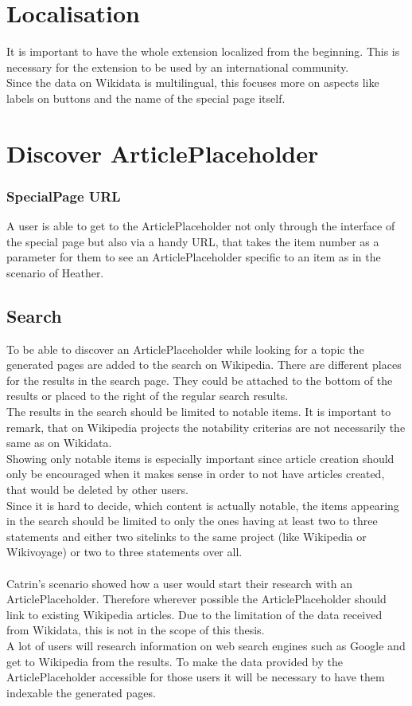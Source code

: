 \section{Localisation}
It is important to have the whole extension localized from the beginning. This is necessary for the extension to be used by an international community. \\ Since the data on Wikidata is multilingual, this focuses more on aspects like labels on buttons and the name of the special page itself.

\section{Discover ArticlePlaceholder}
\subsubsection{SpecialPage URL}
A user is able to get to the ArticlePlaceholder not only through the interface of the special page but also via a handy URL, that takes the item number as a parameter for them to see an ArticlePlaceholder specific to an item as in the scenario of Heather.

\subsection{Search}
To be able to discover an ArticlePlaceholder while looking for a topic the generated pages are added to the search on Wikipedia. There are different places for the results in the search page. They could be attached to the bottom of the results or placed to the right of the regular search results. \\
The results in the search should be limited to notable items. It is important to remark, that on Wikipedia projects the notability criterias are not necessarily the same as on Wikidata. \\
Showing only notable items is especially important since article creation should only be encouraged when it makes sense in order to not have articles created, that would be deleted by other users. \\
Since it is hard to decide, which content is actually notable, the items appearing in the search should be limited to only the ones having at least two to three statements and either two sitelinks to the same project (like Wikipedia or Wikivoyage) or two to three statements over all. \\
\\
Catrin's scenario showed how a user would start their research with an ArticlePlaceholder. Therefore wherever possible the ArticlePlaceholder should link to existing Wikipedia articles. Due to the limitation of the data received from Wikidata, this is not in the scope of this thesis.
\\
A lot of users will research information on web search engines such as Google and get to Wikipedia from the results. To make the data provided by the ArticlePlaceholder accessible for those users it will be necessary to have them indexable the generated pages. 

